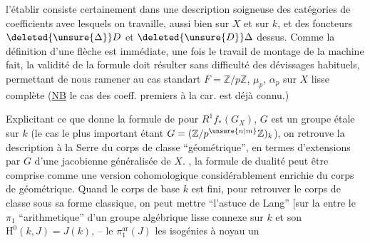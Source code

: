 l'établir consiste certainement dans une description soigneuse des catégories de coefficients avec lesquels on travaille, aussi bien sur $X$ et sur $k$, et des foncteurs $\deleted{\unsure{\Delta}}D$ et $\deleted{\unsure{D}}\Delta$ dessus. Comme la définition d'une flèche est immédiate, une fois le travail de montage de la machine fait, la validité de la formule doit résulter sans difficulté des dévissages habituels, permettant de nous ramener au cas standart $F=\mathbb{Z}/p\mathbb{Z}$, $\mu_p$, $\alpha_p$ sur $X$ lisse complète (\uline{NB} le cas des coeff. premiers à la car. est déjà connu.)

\noindent{}Explicitant ce que donne la formule de  pour $R^1f_*(G_X)$,  $G$ est un groupe  étale sur $k$ (le cas le plus important étant $G=(\mathbb{Z}/p^{\unsure{n|m}}\mathbb{Z})_k$), on retrouve la description à la Serre du corps de classe ``géométrique'', en termes d'extensions par $G$ d'une jacobienne généralisée de $X$. , la formule de dualité peut être comprise comme une version cohomologique considérablement enrichie du corps de  géométrique. Quand le corps de base $k$ est fini, pour retrouver le corps de \unsure{:} classe sous sa forme classique, on peut mettre ``l'astuce de Lang'' [sur la  entre \unsure{,} le $\pi_1$ ``arithmetique'' d'un groupe algébrique  lisse connexe  sur $k$ et son $\mathrm{H}^{0}(k,J)=J(k)$, -- le $\pi_1^{\mathrm{ar}}(J)$  les isogénies  à noyau un  
